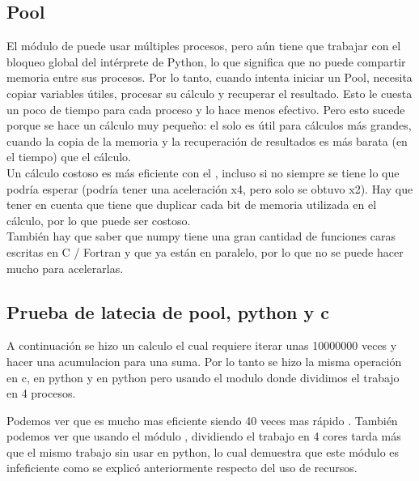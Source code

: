 \subsection{Pool}
    El módulo de  puede usar múltiples procesos, pero aún
    tiene que trabajar con el bloqueo global del intérprete de Python, lo que
    significa que no puede compartir memoria entre sus procesos. Por lo tanto,
    cuando intenta iniciar un Pool, necesita copiar variables útiles, procesar
    su cálculo y recuperar el resultado. Esto le cuesta un poco de tiempo para
    cada proceso y lo hace menos efectivo. Pero esto sucede porque se hace
    un cálculo muy pequeño: el  solo es útil para cálculos
    más grandes, cuando la copia de la memoria y la recuperación de resultados
    es más barata (en el tiempo) que el cálculo.\\

    Un cálculo costoso es más eficiente con el , incluso
    si no siempre se tiene lo que podría esperar (podría tener una aceleración x4,
    pero solo se obtuvo x2). Hay que tener en cuenta que  tiene que
    duplicar cada bit de memoria utilizada en el cálculo, por lo que puede ser
    costoso.\\
    También hay que saber que numpy tiene una gran cantidad de funciones
    caras escritas en C / Fortran y que ya están en paralelo, por lo que no
    se puede hacer mucho para acelerarlas.
\subsection{Prueba de latecia de pool, python y c}
    A continuación se hizo un calculo el cual requiere iterar unas 10000000 veces
    y hacer una acumulacion para una suma. Por lo tanto se hizo la misma operación
    en c, en python y en python pero usando el modulo  donde dividimos el
    trabajo en 4 procesos.
    \def\text{tiempos de la pruebas en segundos}
    \def\path{test_pool.png}
    \def\scale{.6}
    
    Podemos ver que  es mucho mas eficiente siendo 40 veces mas rápido
    . También podemos ver que usando el módulo , dividiendo
    el trabajo en 4 cores tarda más que el mismo trabajo sin usar 
    en python, lo cual demuestra que este módulo es infeficiente como se explicó
    anteriormente respecto del uso de recursos. 